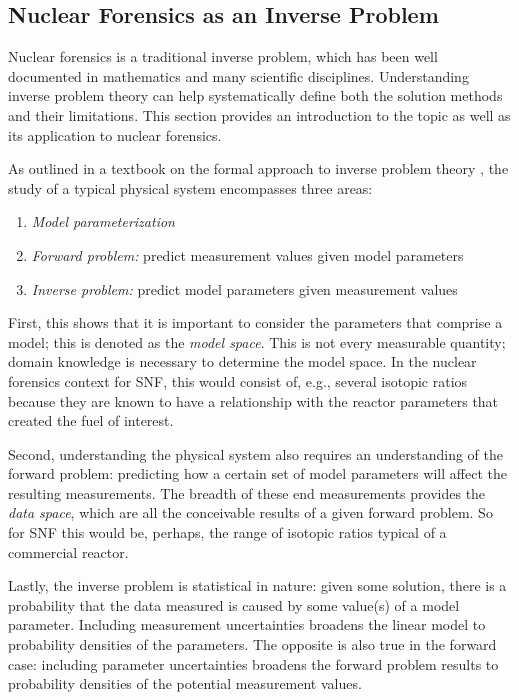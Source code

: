 \subsection{Nuclear Forensics as an Inverse Problem}
\label{sec:inverse}

Nuclear forensics is a traditional inverse problem, which has been well
documented in mathematics and many scientific disciplines.  Understanding
inverse problem theory can help systematically define both the solution methods
and their limitations. This section provides an introduction to the topic as
well as its application to nuclear forensics. 

As outlined in a textbook on the formal approach to inverse problem theory
\cite{inverse_theory}, the study of a typical physical system encompasses three
areas:
\begin{enumerate}
  \itemsep-0.75em
  \item \textit{Model parameterization}
  \item \textit{Forward problem:} predict measurement values given model parameters
  \item \textit{Inverse problem:} predict model parameters given measurement values
\end{enumerate}

First, this shows that it is important to consider the parameters that comprise
a model; this is denoted as the \textit{model space}. This is not every
measurable quantity; domain knowledge is necessary to determine the model
space. In the nuclear forensics context for \gls{SNF}, this would consist of,
e.g., several isotopic ratios because they are known to have a relationship
with the reactor parameters that created the fuel of interest.

Second, understanding the physical system also requires an understanding of the
forward problem: predicting how a certain set of model parameters will affect
the resulting measurements. The breadth of these end measurements provides the
\textit{data space}, which are all the conceivable results of a given forward
problem. So for \gls{SNF} this would be, perhaps, the range of isotopic ratios
typical of a commercial reactor. 

Lastly, the inverse problem is statistical in nature: given some solution,
there is a probability that the data measured is caused by some value(s) of a
model parameter. Including measurement uncertainties broadens the linear model
to probability densities of the parameters. The opposite is also true in the
forward case: including parameter uncertainties broadens the forward problem
results to probability densities of the potential measurement values.
\cite{inverse_theory}

